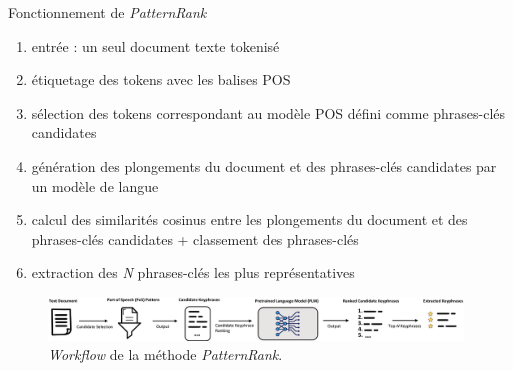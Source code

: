 \begin{frame}{Fonctionnement de \textit{PatternRank}}
\begin{enumerate}
\item entrée : un seul document texte tokenisé
\item étiquetage des tokens avec les balises POS
\item sélection des tokens correspondant au modèle POS défini comme phrases-clés candidates
\item génération des plongements du document et des phrases-clés candidates par un modèle de langue
\item calcul des similarités cosinus entre les plongements du document et des phrases-clés candidates + classement des phrases-clés
\item extraction des \textit{N} phrases-clés les plus représentatives
\end{enumerate}
\begin{figure}
    \centering
    \includegraphics[width=110mm,scale=0.5]{pic/patternrank_workflow.png}
    \caption{\textit{Workflow} de la méthode \textit{PatternRank}.}
    \label{fig:enter-label}
\end{figure}
\end{frame}